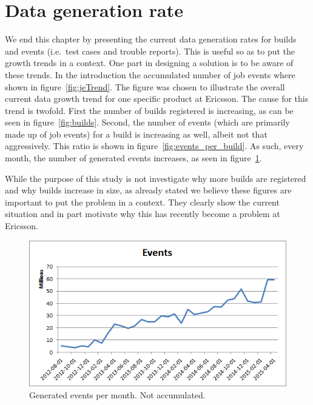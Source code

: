 \section{Data generation rate}
\label{datagenrate}
We end this chapter by presenting the current data generation rates for builds and events (i.e.\ test cases and trouble reports). This is useful so as to put the growth trends in a context. One part in designing a solution is to be aware of these trends. In the introduction the accumulated number of job events where shown in figure~\ref{fig:jeTrend}. The figure was chosen to illustrate the overall current data growth trend for one specific product at Ericsson. The cause for this trend is twofold. First the number of builds registered is increasing, as can be seen in figure~\ref{fig:builds}. Second, the number of events (which are primarily made up of job events) for a build is increasing as well, albeit not that aggressively. This ratio is shown in figure~\ref{fig:events_per_build}. As such, every month, the number of generated events increases, as seen in figure~\ref{fig:events}.

While the purpose of this study is not investigate why more builds are registered and why builds increase in size, as already stated we believe these figures are important to put the problem in a context. They clearly show the current situation and in part motivate why this has recently become a problem at Ericsson.

%

\begin{figure}[h!]
\centering
\includegraphics[]{figure/events.png}
\caption{Generated events per month. Not accumulated.}
\label{fig:events}
\end{figure}

